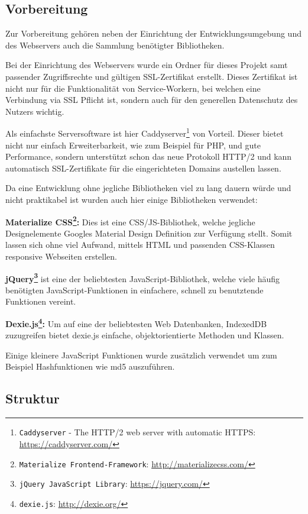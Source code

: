 \documentclass[a4paper,12pt,ngerman,listof=numbered]{scrartcl}      %
\let\oldcite\cite
\renewcommand{\cite}[1]{\textsuperscript{\oldcite{#1}}}
\newcommand{\spacer}{\par\bigskip\noindent}
\providecommand{\inlinecode}[1]{\texttt{#1}}
\begin{document}
	\subsection{Vorbereitung}
	Zur Vorbereitung gehören neben der Einrichtung der Entwicklungsumgebung und des Webservers auch die Sammlung benötigter Bibliotheken.\par
	Bei der Einrichtung des Webservers wurde ein Ordner für dieses Projekt samt passender Zugriffsrechte und gültigen SSL-Zertifikat erstellt. Dieses Zertifikat ist nicht nur für die Funktionalität von Service-Workern, bei welchen eine Verbindung via SSL Pflicht ist, sondern auch für den generellen Datenschutz des Nutzers wichtig.\par
	Als einfachste Serversoftware ist hier Caddyserver\footnote{\inlinecode{Caddyserver} - The HTTP/2 web server with automatic HTTPS: \url{https://caddyserver.com/}} von Vorteil. Dieser bietet nicht nur einfach Erweiterbarkeit, wie zum Beispiel für PHP, und gute Performance, sondern unterstützt schon das neue Protokoll HTTP/2 und kann automatisch SSL-Zertifikate für die eingerichteten Domains austellen lassen.\par
	\noindent Da eine Entwicklung ohne jegliche Bibliotheken viel zu lang dauern würde und nicht praktikabel ist wurden auch hier einige Bibliotheken verwendet:\par
	\spacer\textbf{Materialize CSS\footnote{\inlinecode{Materialize Frontend-Framework}: \url{http://materializecss.com/}}:} Dies ist eine CSS/JS-Bibliothek, welche jegliche Designelemente Googles Material Design Definition zur Verfügung stellt. Somit lassen sich ohne viel Aufwand, mittels HTML und passenden CSS-Klassen responsive Webseiten erstellen.\par
	\spacer\textbf{jQuery\footnote{\inlinecode{jQuery JavaScript Library}: \url{https://jquery.com/}}} ist eine der beliebtesten JavaScript-Bibliothek\cite{jQueryCoverage}, welche viele häufig benötigten JavaScript-Funktionen in einfachere, schnell zu benutztende Funktionen vereint.\par
	\spacer\textbf{Dexie.js\footnote{\inlinecode{dexie.js}: \url{http://dexie.org/}}:} Um auf eine der beliebtesten Web Datenbanken, IndexedDB zuzugreifen bietet dexie.js einfache, objektorientierte Methoden und Klassen.\par
	\spacer Einige kleinere JavaScript Funktionen wurde zusätzlich verwendet um zum Beispiel Hashfunktionen wie md5 auszuführen.\par
	\subsection{Struktur}
\end{document}
